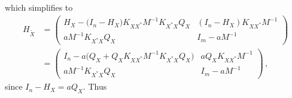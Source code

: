 \documentclass[a4paper,14pt]{article}
\begin{document}
which simplifies to
\begin{align*}
  H_{\tilde{X}}
    & = \begin{pmatrix}
      H_X - \bigl(I_n - H_X \bigr) K_{XX^*} M^{-1} K_{X^*X} Q_X
      & (I_n - H_X) K_{XX^*} M^{-1} \\
      a M^{-1} K_{X^*X} Q_X
      & I_m - a M^{-1}
    \end{pmatrix}\\
    & = \begin{pmatrix}
      I_n - a \bigl( Q_X + Q_X K_{XX^*} M^{-1} K_{X^*X} Q_X \bigr)
      & a Q_X K_{XX^*} M^{-1} \\
      a M^{-1} K_{X^*X} Q_X
      & I_m - a M^{-1}
    \end{pmatrix} \,,
\end{align*}
since $I_n - H_X = a Q_X$. Thus
\end{document}
